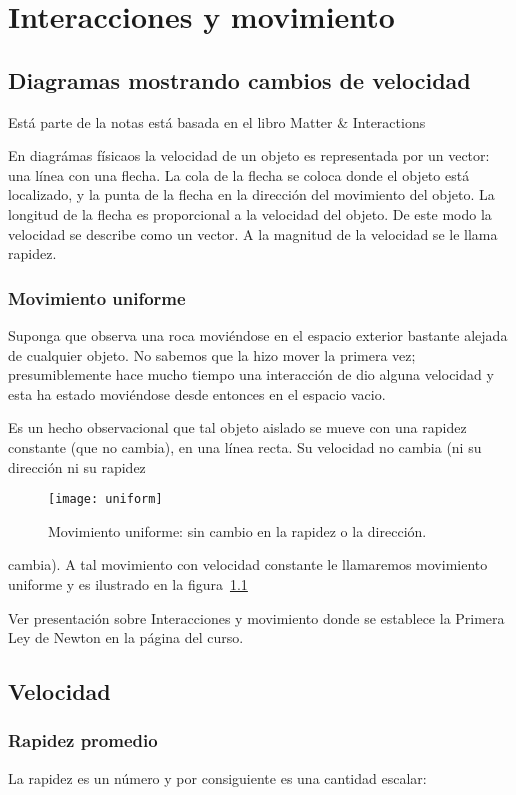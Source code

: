 
\chapter{Interacciones y movimiento}

 
\section{Diagramas mostrando cambios de velocidad}

Está parte de la notas está basada en el libro Matter \& Interactions \cite{MI}

En diagrámas físicaos la velocidad de un objeto es representada por un
vector: una línea con una flecha. La cola de la flecha se coloca donde
el objeto está localizado, y la punta de la flecha en la dirección del
movimiento del objeto. La longitud de la flecha es proporcional a la
velocidad del objeto. De este modo la velocidad se describe como un
vector. A la magnitud de la velocidad se le llama rapidez.

\subsection{Movimiento uniforme}
Suponga que observa una roca moviéndose en el espacio exterior
bastante alejada de cualquier objeto. No sabemos que la hizo mover la
primera vez; presumiblemente hace mucho tiempo una interacción de dio
alguna velocidad y esta ha estado moviéndose desde entonces en el
espacio vacio.

Es un hecho observacional que tal objeto aislado se mueve con una
rapidez constante (que no cambia), en una línea recta. Su velocidad no
cambia (ni su dirección ni su rapidez
\begin{figure}
  \centering
  \texttt{[image: uniform]}
  \caption{Movimiento uniforme: sin cambio en la rapidez o la dirección.}
  \label{fig:uniform}
\end{figure}
cambia). A tal movimiento con
velocidad constante le llamaremos movimiento uniforme y es ilustrado
en la figura~\ref{fig:uniform}

Ver presentación sobre Interacciones y movimiento donde se establece la Primera Ley de Newton en la página del curso.

\section{Velocidad}

\subsection{Rapidez promedio}
La rapidez es un número y por consiguiente es una cantidad escalar:

